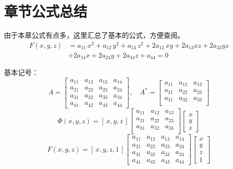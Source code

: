 \section{章节公式总结}\label{章节公式总结}
\par 由于本章公式有点多，这里汇总了基本的公式，方便查阅。
\begin{equation}
\begin{split}
F(x,y,z)&=a_{11} \, x^2+a_{12} \, y^2+a_{13} \, z^2+2a_{12} \, xy+2a_{13}xz+2a_{23}yz\\
&+2a_{14}x+2a_{24}y+2a_{34}z+a_{44}=0
\end{split}
\end{equation}
\par 基本记号：
\begin{equation}
\label{A}
A = 
\left[
\begin{array}{cccc}
a_{11} & a_{12} & a_{13} & a_{14} \\
a_{21} & a_{22} & a_{23} & a_{24} \\
a_{31} & a_{32} & a_{33} & a_{34} \\
a_{41} & a_{42} & a_{43} & a_{44}
\end{array}
\right]
,\quad
A^*=
\left[
\begin{array}{ccc}
a_{11} & a_{12} & a_{13}  \\
a_{21} & a_{22} & a_{23}  \\
a_{31} & a_{32} & a_{33}  \\
\end{array}
\right]
\end{equation}
\jg
\begin{equation}
\label{varPhi}
\varPhi(x,y,z)=
\left[\,x,y,z\,\right] 
\left[
\begin{array}{ccc}
a_{11} & a_{12} & a_{13}  \\
a_{21} & a_{22} & a_{23}  \\
a_{31} & a_{32} & a_{33}  \\
\end{array}
\right]
\left[
\begin{array}{c}
x \\
y \\
z 
\end{array}
\right]
\end{equation}
\jg
\begin{equation}
F(x,y,z)=
\left[\,x,y,z,1\,\right] 
\left[
\begin{array}{cccc}
a_{11} & a_{12} & a_{13} & a_{14} \\
a_{21} & a_{22} & a_{23} & a_{24} \\
a_{31} & a_{32} & a_{33} & a_{34} \\
a_{41} & a_{42} & a_{43} & a_{44}
\end{array}
\right]
\left[
\begin{array}{c}
x \\
y \\
z \\
1
\end{array}
\right]
\end{equation}
